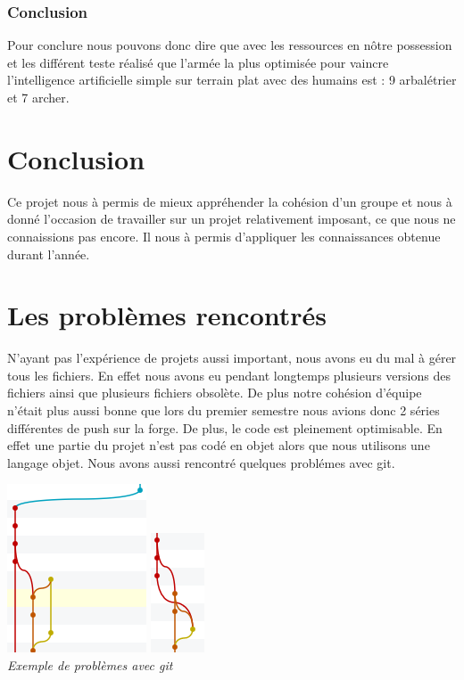 \documentclass{article}
\begin{document}
	\subsubsection{Conclusion}
	
	Pour conclure nous pouvons donc dire que avec les ressources en nôtre possession et les différent teste réalisé que l'armée la plus optimisée pour vaincre l'intelligence artificielle simple sur terrain plat avec des humains est : 9 arbalétrier et 7 archer.

\newpage
\section{Conclusion}
Ce projet nous à permis de mieux appréhender la cohésion d'un groupe et nous à donné l'occasion de travailler sur un projet relativement imposant, ce que nous ne connaissions pas encore. Il nous à permis d'appliquer les connaissances obtenue durant l'année.

\section{Les problèmes rencontrés}
 N'ayant pas l'expérience de projets aussi important, nous avons eu du mal à gérer tous les fichiers. En effet nous avons eu pendant longtemps plusieurs versions des fichiers ainsi que plusieurs fichiers obsolète. De plus notre cohésion d'équipe n'était plus aussi bonne que lors du premier semestre nous avions donc 2 séries différentes de push sur la forge. De plus, le code est pleinement optimisable. En effet une partie du projet n'est pas codé en objet alors que nous utilisons une langage objet. Nous avons aussi rencontré quelques problémes avec git.\\
 \begin{center}
 \includegraphics[scale=1]{../images/arbre1.png}
 \hspace{3cm}
 \includegraphics[scale=1]{../images/arbre2.png}\\
 \textit{Exemple de problèmes avec git}
 \end{center}
 
\end{document}
